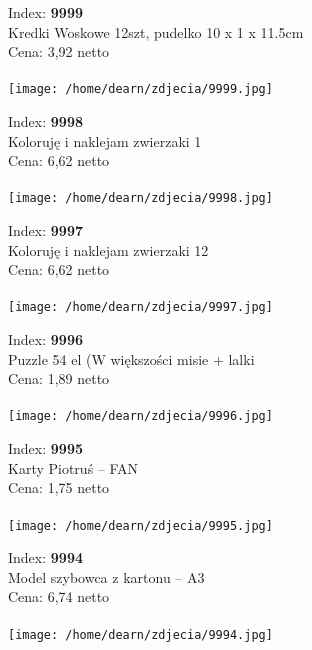 
{Index: \textbf{9999}\\
Kredki Woskowe 12szt, pudelko 10 x 1 x 11.5cm \\
Cena: 3,92 netto   \\\\  \texttt{[image: /home/dearn/zdjecia/9999.jpg]}}\newline\newline

{Index: \textbf{9998}\\
Koloruję i naklejam zwierzaki 1 \\
Cena: 6,62 netto   \\\\  \texttt{[image: /home/dearn/zdjecia/9998.jpg]}}\newline\newline

{Index: \textbf{9997}\\
Koloruję i naklejam zwierzaki 12\\
Cena: 6,62 netto   \\\\  \texttt{[image: /home/dearn/zdjecia/9997.jpg]}}\newline\newline

{Index: \textbf{9996}\\
Puzzle 54 el (W większości misie + lalki\\
Cena: 1,89 netto   \\\\  \texttt{[image: /home/dearn/zdjecia/9996.jpg]}}\newline\newline

{Index: \textbf{9995}\\
Karty Piotruś – FAN\\
Cena: 1,75 netto   \\\\  \texttt{[image: /home/dearn/zdjecia/9995.jpg]}}\newline\newline

{Index: \textbf{9994}\\
Model szybowca z kartonu – A3\\
Cena: 6,74 netto   \\\\  \texttt{[image: /home/dearn/zdjecia/9994.jpg]}}\newline\newline


